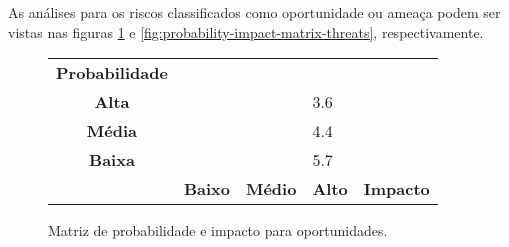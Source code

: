 As análises para os riscos classificados como oportunidade ou ameaça podem ser vistas nas figuras \ref{fig:probability-impact-matrix-oportunity} e \ref{fig:probability-impact-matrix-threats}, respectivamente.

\begin{figure}[h]
	\begin{tabularx}{\textwidth}{ c | >{\centering\arraybackslash}X >{\centering\arraybackslash}X >{\centering\arraybackslash}X l}
		\textbf{Probabilidade} &                                     &                                       &                                  &                  \\
		\cellcolor{red!30!}\textbf{Alta} &
		\cellcolor{yellow!10!} &
		\cellcolor{red!10!} &
		\cellcolor{red!10!}3.6 &   \\
		\cellcolor{yellow!30!}\textbf{Média}&
		\cellcolor{green!10!} &
		\cellcolor{yellow!10!} &
		\cellcolor{red!10!} 4.4 &   \\
		\cellcolor{green!30!}\textbf{Baixa}&
		\cellcolor{green!10!} &
		\cellcolor{green!10!} &
		\cellcolor{yellow!10!} 5.7 &   \\
		\hline
		                       & \cellcolor{green!30!}\textbf{Baixo} & \cellcolor{yellow!30!}\textbf{Médio} & \cellcolor{red!30!}\textbf{Alto} & \textbf{Impacto} \\
	\end{tabularx}
	\caption{Matriz de probabilidade e impacto para oportunidades.}
	\label{fig:probability-impact-matrix-oportunity}
	\centering
\end{figure}

